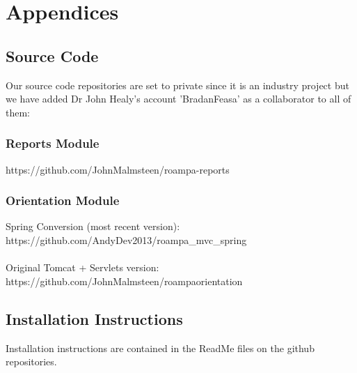\chapter{Appendices}
\section{Source Code}
Our source code repositories are set to private since it is an industry project but we have added Dr John Healy's account 'BradanFeasa' as a collaborator to all of them:

\subsection{Reports Module}
https://github.com/JohnMalmsteen/roampa-reports

\subsection{Orientation Module}
Spring Conversion (most recent version):\\
https://github.com/AndyDev2013/roampa\_mvc\_spring \\\\ 
Original Tomcat + Servlets version:\\
https://github.com/JohnMalmsteen/roampaorientation 

\section{Installation Instructions}
Installation instructions are contained in the ReadMe files on the github repositories.


